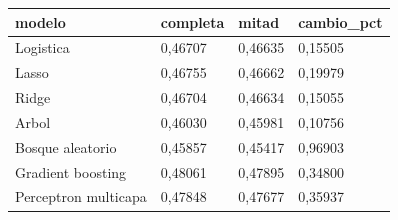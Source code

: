 \begin{tabular}{llll}
\toprule
modelo & completa & mitad & cambio\_pct \\
\midrule
Logistica & 0{,}46707 & 0{,}46635 & 0{,}15505 \\
Lasso & 0{,}46755 & 0{,}46662 & 0{,}19979 \\
Ridge & 0{,}46704 & 0{,}46634 & 0{,}15055 \\
Arbol & 0{,}46030 & 0{,}45981 & 0{,}10756 \\
Bosque aleatorio & 0{,}45857 & 0{,}45417 & 0{,}96903 \\
Gradient boosting & 0{,}48061 & 0{,}47895 & 0{,}34800 \\
Perceptron multicapa & 0{,}47848 & 0{,}47677 & 0{,}35937 \\
\bottomrule
\end{tabular}
